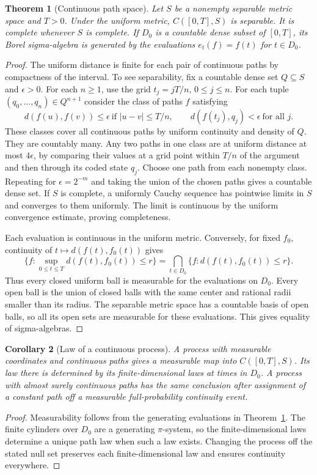 \documentclass[11pt,oneside,openany]{book}
\theoremstyle{plain}
\newtheorem{theorem}{Theorem}[chapter]
\newtheorem{corollary}[theorem]{Corollary}
\theoremstyle{definition}
\theoremstyle{remark}
\begin{document}
\begin{theorem}[Continuous path space]\label{thm:path-borel}
Let \(S\) be a nonempty separable metric space and \(T>0\). Under the uniform metric, \(C([0,T],S)\) is separable. It is complete whenever \(S\) is complete. If \(D_0\) is a countable dense subset of \([0,T]\), its Borel sigma-algebra is generated by the evaluations \(e_t(f)=f(t)\) for \(t\in D_0\).
\end{theorem}
\begin{proof}
The uniform distance is finite for each pair of continuous paths by compactness of the interval. To see separability, fix a countable dense set \(Q\subseteq S\) and \(\epsilon>0\). For each \(n\ge1\), use the grid \(t_j=jT/n\), \(0\le j\le n\). For each tuple \((q_0,\ldots,q_n)\in Q^{n+1}\) consider the class of paths \(f\) satisfying
\[
 d(f(u),f(v))\le\epsilon \ \text{if }\lvert u-v\rvert\le T/n,
 \qquad d(f(t_j),q_j)<\epsilon\ \text{for all }j.
\]
These classes cover all continuous paths by uniform continuity and density of \(Q\). They are countably many. Any two paths in one class are at uniform distance at most \(4\epsilon\), by comparing their values at a grid point within \(T/n\) of the argument and then through its coded state \(q_j\). Choose one path from each nonempty class. Repeating for \(\epsilon=2^{-m}\) and taking the union of the chosen paths gives a countable dense set. If \(S\) is complete, a uniformly Cauchy sequence has pointwise limits in \(S\) and converges to them uniformly. The limit is continuous by the uniform convergence estimate, proving completeness.

Each evaluation is continuous in the uniform metric. Conversely, for fixed \(f_0\), continuity of \(t\mapsto d(f(t),f_0(t))\) gives
\[
 \{f:\sup_{0\le t\le T}d(f(t),f_0(t))\le r\}
 =\bigcap_{t\in D_0}\{f:d(f(t),f_0(t))\le r\}.
\]
Thus every closed uniform ball is measurable for the evaluations on \(D_0\). Every open ball is the union of closed balls with the same center and rational radii smaller than its radius. The separable metric space has a countable basis of open balls, so all its open sets are measurable for these evaluations. This gives equality of sigma-algebras.
\end{proof}

\begin{corollary}[Law of a continuous process]\label{cor:continuous-path-law}
A process with measurable coordinates and continuous paths gives a measurable map into \(C([0,T],S)\). Its law there is determined by its finite-dimensional laws at times in \(D_0\). A process with almost surely continuous paths has the same conclusion after assignment of a constant path off a measurable full-probability continuity event.
\end{corollary}
\begin{proof}
Measurability follows from the generating evaluations in Theorem~\ref{thm:path-borel}. The finite cylinders over \(D_0\) are a generating \(\pi\)-system, so the finite-dimensional laws determine a unique path law when such a law exists. Changing the process off the stated null set preserves each finite-dimensional law and ensures continuity everywhere.
\end{proof}
\end{document}
